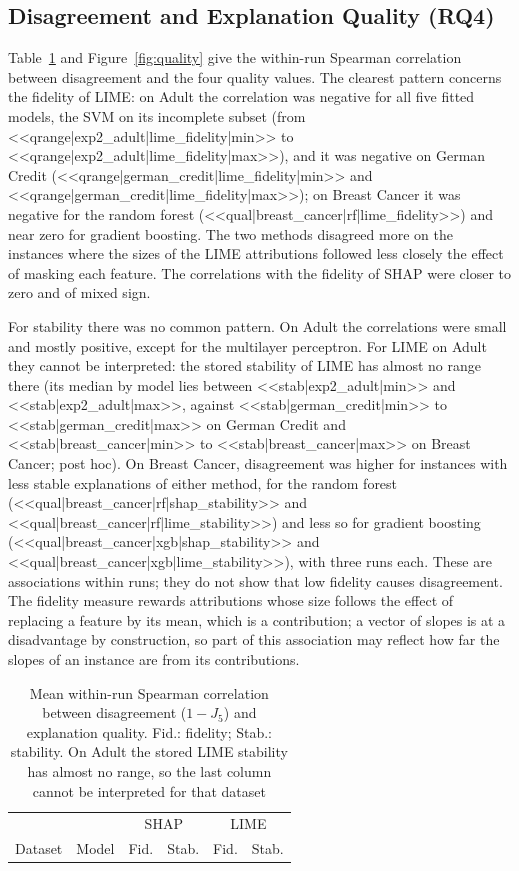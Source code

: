 \subsection{Disagreement and Explanation Quality (RQ4)}

Table~\ref{tab:quality} and Figure~\ref{fig:quality} give the within-run Spearman
correlation between disagreement and the four quality values. The clearest pattern
concerns the fidelity of LIME: on Adult the correlation was negative for all five fitted
models, the SVM on its incomplete subset (from <<qrange|exp2_adult|lime_fidelity|min>> to
<<qrange|exp2_adult|lime_fidelity|max>>), and it was negative on German Credit
(<<qrange|german_credit|lime_fidelity|min>> and
<<qrange|german_credit|lime_fidelity|max>>); on Breast Cancer it was negative for the
random forest (<<qual|breast_cancer|rf|lime_fidelity>>) and near zero for gradient
boosting. The two methods disagreed more on the
instances where the sizes of the LIME attributions followed less closely the effect of
masking each feature. The
correlations with the fidelity of SHAP were closer to zero and of mixed sign.

For stability there was no common pattern. On Adult the correlations were small and
mostly positive, except for the multilayer perceptron. For LIME on Adult they cannot be
interpreted: the stored stability of LIME has almost no range there (its median by model
lies between <<stab|exp2_adult|min>> and <<stab|exp2_adult|max>>, against
<<stab|german_credit|min>> to <<stab|german_credit|max>> on German Credit and
<<stab|breast_cancer|min>> to <<stab|breast_cancer|max>> on Breast Cancer; post hoc). On
Breast Cancer, disagreement was higher for instances with less stable explanations of
either method, for the random forest (<<qual|breast_cancer|rf|shap_stability>> and
<<qual|breast_cancer|rf|lime_stability>>) and less so for gradient boosting
(<<qual|breast_cancer|xgb|shap_stability>> and <<qual|breast_cancer|xgb|lime_stability>>),
with three runs each. These are associations within runs; they do not show that low fidelity
causes disagreement. The fidelity measure rewards attributions whose size follows the
effect of replacing a feature by its mean, which is a contribution; a vector of slopes is
at a disadvantage by construction, so part of this association may reflect how far the
slopes of an instance are from its contributions.

\begin{table}[t]
\renewcommand{\arraystretch}{\tablestretch}
\centering
\caption{Mean within-run Spearman correlation between disagreement ($1 - J_5$) and explanation quality. Fid.: fidelity; Stab.: stability. On Adult the stored LIME stability has almost no range, so the last column cannot be interpreted for that dataset}
\label{tab:quality}
\small
\setlength{\tabcolsep}{\mediumcolsep}
\begin{tabular}{llrrrr}
\hline
 & & \multicolumn{2}{c}{SHAP} & \multicolumn{2}{c}{LIME} \\
Dataset & Model & Fid. & Stab. & Fid. & Stab. \\
\hline

\end{tabular}
\end{table}

